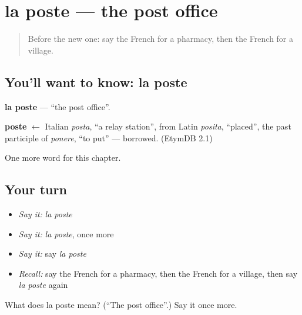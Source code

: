 \section[la poste]{la poste — the post office}

\label{lesson:FR-C101-poste}



\begin{quote}
Before the new one: say the French for a pharmacy, then the French for a village.
\end{quote}

\subsection*{You'll want to know: la poste}
\textbf{la poste} — \textquotedblleft{}the post office\textquotedblright{}.

\begin{cousinweb}
\textbf{poste} $\leftarrow$ Italian \emph{posta}, \textquotedblleft{}a relay station\textquotedblright{}, from Latin \emph{posita}, \textquotedblleft{}placed\textquotedblright{}, the past participle of \emph{ponere}, \textquotedblleft{}to put\textquotedblright{} — borrowed. (EtymDB 2.1)
\end{cousinweb}

\begin{grammarlens}[title={What you've built}]
One more word for this chapter.
\end{grammarlens}

\subsection*{Your turn}
\begin{itemize}
\raggedright
  \item \emph{Say it:} \emph{la poste}
  \item \emph{Say it:} \emph{la poste}, once more
  \item \emph{Say it:} say \emph{la poste}
  \item \emph{Recall:} say the French for a pharmacy, then the French for a village, then say \emph{la poste} again
\end{itemize}

\begin{tcolorbox}[breakable,colback=teal!4,colframe=teal!35!black,title={Before you move on}]
What does la poste mean? (\textquotedblleft{}The post office\textquotedblright{}.) Say it once more.
\end{tcolorbox}
